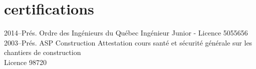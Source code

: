 \documentclass[print]{friggos-cv} %
\begin{document}

\section{certifications}
  \begin{entrylist}
    \entryFULL
      {2014--Prés.}
      {Ordre des Ingénieurs du Québec}
      {}
      {Ingénieur Junior - Licence 5055656}
      {}
    \entryFULL
      {2003--Prés.}
      {ASP Construction}
      {}
      {Attestation cours santé et sécurité générale sur les chantiers de construction\\Licence 98720}
      {}
\end{entrylist}

%


\end{document}
